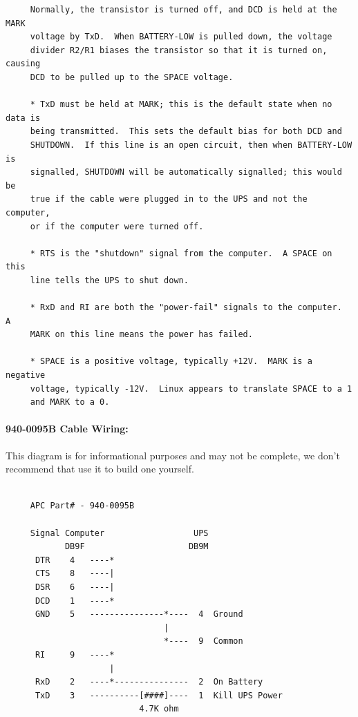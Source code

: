 {{{{{{{{{{\begin{verbatim}
     Normally, the transistor is turned off, and DCD is held at the MARK
     voltage by TxD.  When BATTERY-LOW is pulled down, the voltage
     divider R2/R1 biases the transistor so that it is turned on, causing
     DCD to be pulled up to the SPACE voltage.
     
     * TxD must be held at MARK; this is the default state when no data is
     being transmitted.  This sets the default bias for both DCD and
     SHUTDOWN.  If this line is an open circuit, then when BATTERY-LOW is
     signalled, SHUTDOWN will be automatically signalled; this would be
     true if the cable were plugged in to the UPS and not the computer,
     or if the computer were turned off.
     
     * RTS is the "shutdown" signal from the computer.  A SPACE on this
     line tells the UPS to shut down.
     
     * RxD and RI are both the "power-fail" signals to the computer.  A
     MARK on this line means the power has failed.
     
     * SPACE is a positive voltage, typically +12V.  MARK is a negative
     voltage, typically -12V.  Linux appears to translate SPACE to a 1
     and MARK to a 0.
\end{verbatim}
\normalsize

\label{940_002d0095B-Cable-Wiring}

\paragraph*{940-0095B Cable Wiring:}

\label{index-Cables-207}
This diagram is for informational purposes and may not be complete, we don't
recommend that use it to build one yourself. 

\footnotesize
\begin{verbatim}
     
     APC Part# - 940-0095B
     
     Signal Computer                  UPS
            DB9F                     DB9M
      DTR    4   ----*
      CTS    8   ----|
      DSR    6   ----|
      DCD    1   ----*
      GND    5   ---------------*----  4  Ground
                                |
                                *----  9  Common
      RI     9   ----*
                     |
      RxD    2   ----*---------------  2  On Battery
      TxD    3   ----------[####]----  1  Kill UPS Power
                           4.7K ohm
\end{verbatim}
\normalsize

}}}}}}}}}}
